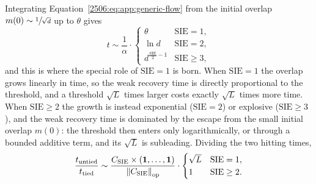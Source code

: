 Integrating Equation~\eqref{2506:eq:app:generic-flow} from the initial overlap \(m(0) \sim \sfrac{1}{\sqrt{d}}\) up to \(\theta\) gives
\begin{equation} \label{2506:eq:app:hitting-times}
    t \sim \frac{1}{\alpha}\cdot\begin{cases}
        \theta & \mathrm{SIE} = 1,\\
        \ln d & \mathrm{SIE} = 2,\\
        d^{\frac{\mathrm{SIE}}{2}-1} & \mathrm{SIE} \ge 3,
    \end{cases}
\end{equation}
and this is where the special role of \(\mathrm{SIE}=1\) is born. When \(\mathrm{SIE}=1\) the overlap grows linearly in time, so the weak recovery time is directly proportional to the threshold, and a threshold \(\sqrt{L}\) times larger costs exactly \(\sqrt{L}\) times more time. When \(\mathrm{SIE}\ge 2\) the growth is instead exponential (\(\mathrm{SIE}=2\)) or explosive (\(\mathrm{SIE}\ge 3\)), and the weak recovery time is dominated by the escape from the small initial overlap \(m(0)\): the threshold then enters only logarithmically, or through a bounded additive term, and its \(\sqrt{L}\) is subleading. Dividing the two hitting times,
\begin{equation} \label{2506:eq:app:flow-ratio}
    \frac{t_\mathrm{untied}}{t_\mathrm{tied}} \sim \frac{C_\mathrm{SIE} \times ({\boldsymbol{1}},\dots,{\boldsymbol{1}})}{\left\lVert C_\mathrm{SIE}\right\rVert_\mathrm{op}} \cdot \begin{cases}
        \sqrt{L} & \mathrm{SIE} = 1,\\
        1 & \mathrm{SIE} \ge 2.
    \end{cases}
\end{equation}

